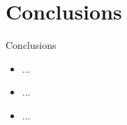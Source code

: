 \documentclass[t]{beamer}
\begin{document}
\section{Conclusions}

\begin{frame}[c]{Conclusions}
\begin{itemize}
\item  ...
\item ...
\item ...
\end{itemize}
\end{frame}
\end{document}
